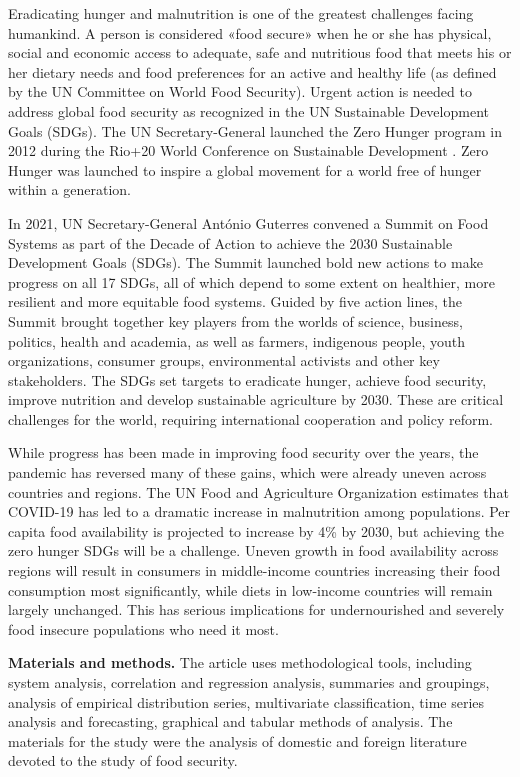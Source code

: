 \begin{multicols}{2}
Eradicating hunger and malnutrition is one of the greatest challenges
facing humankind. A person is considered «food secure» when he or she
has physical, social and economic access to adequate, safe and
nutritious food that meets his or her dietary needs and food preferences
for an active and healthy life (as defined by the UN Committee on World
Food Security). Urgent action is needed to address global food security
as recognized in the UN Sustainable Development Goals (SDGs). The UN
Secretary-General launched the Zero Hunger program in 2012 during the
Rio+20 World Conference on Sustainable Development . Zero Hunger was
launched to inspire a global movement for a world free of hunger within
a generation.

In 2021, UN Secretary-General António Guterres convened a Summit on Food
Systems as part of the Decade of Action to achieve the 2030 Sustainable
Development Goals (SDGs). The Summit launched bold new actions to make
progress on all 17 SDGs, all of which depend to some extent on
healthier, more resilient and more equitable food systems. Guided by
five action lines, the Summit brought together key players from the
worlds of science, business, politics, health and academia, as well as
farmers, indigenous people, youth organizations, consumer groups,
environmental activists and other key stakeholders. The SDGs set targets
to eradicate hunger, achieve food security, improve nutrition and
develop sustainable agriculture by 2030. These are critical challenges
for the world, requiring international cooperation and policy reform.

While progress has been made in improving food security over the years,
the pandemic has reversed many of these gains, which were already uneven
across countries and regions. The UN Food and Agriculture Organization
estimates that COVID-19 has led to a dramatic increase in malnutrition
among populations. Per capita food availability is projected to increase
by 4\% by 2030, but achieving the zero hunger SDGs will be a challenge.
Uneven growth in food availability across regions will result in
consumers in middle-income countries increasing their food consumption
most significantly, while diets in low-income countries will remain
largely unchanged. This has serious implications for undernourished and
severely food insecure populations who need it most.

{\bfseries Materials and methods.} The article uses methodological tools,
including system analysis, correlation and regression analysis,
summaries and groupings, analysis of empirical distribution series,
multivariate classification, time series analysis and forecasting,
graphical and tabular methods of analysis. The materials for the study
were the analysis of domestic and foreign literature devoted to the
study of food security.


\end{multicols}
